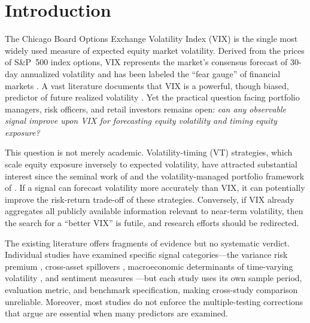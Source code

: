 \documentclass[12pt,a4paper]{article}
\begin{document}
\begin{abstract}
\medskip
\noindent
\textbf{Keywords:} VIX, volatility forecasting, volatility timing, out-of-sample evaluation, variance risk premium, multiple testing, option-implied volatility, drawdown insurance, proxy-robust loss, model confidence set, Value-at-Risk

\medskip
\noindent
\textbf{JEL Classification:} C53, G11, G12, G17
\end{abstract}

\newpage
\tableofcontents
\newpage

\section{Introduction}
\label{sec:intro}

The Chicago Board Options Exchange Volatility Index (VIX) is the single most widely used measure of expected equity market volatility. Derived from the prices of S\&P~500 index options, VIX represents the market's consensus forecast of 30-day annualized volatility and has been labeled the ``fear gauge'' of financial markets \citep{whaley2000}. A vast literature documents that VIX is a powerful, though biased, predictor of future realized volatility \citep{christensen1998, jiang2005, bekaert2014}. Yet the practical question facing portfolio managers, risk officers, and retail investors remains open: \emph{can any observable signal improve upon VIX for forecasting equity volatility and timing equity exposure?}

This question is not merely academic. Volatility-timing (VT) strategies, which scale equity exposure inversely to expected volatility, have attracted substantial interest since the seminal work of \citet{fleming2001} and the volatility-managed portfolio framework of \citet{moreira2017}. If a signal can forecast volatility more accurately than VIX, it can potentially improve the risk-return trade-off of these strategies. Conversely, if VIX already aggregates all publicly available information relevant to near-term volatility, then the search for a ``better VIX'' is futile, and research efforts should be redirected.

The existing literature offers fragments of evidence but no systematic verdict. Individual studies have examined specific signal categories---the variance risk premium \citep{bollerslev2009}, cross-asset spillovers \citep{diebold2012}, macroeconomic determinants of time-varying volatility \citep{schwert1989, engle2008}, and sentiment measures \citep{baker2006}---but each study uses its own sample period, evaluation metric, and benchmark specification, making cross-study comparison unreliable. Moreover, most studies do not enforce the multiple-testing corrections that \citet{harvey2016} argue are essential when many predictors are examined.
\end{document}
